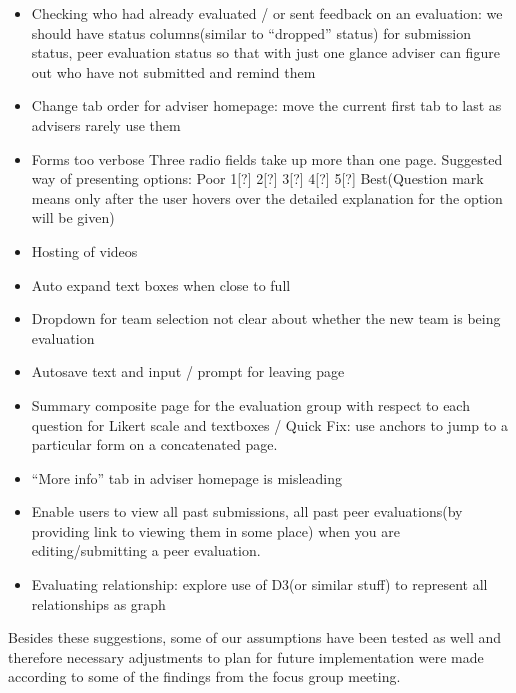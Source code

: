 \begin{itemize}
  \item Checking who had already evaluated / or sent feedback on an evaluation: we should have status columns(similar to ``dropped'' status) for submission status, peer evaluation status so that with just one glance adviser can figure out who have not submitted and remind them
  \item Change tab order for adviser homepage: move the current first tab to last as advisers rarely use them
  \item Forms too verbose Three radio fields take up more than one page. Suggested way of presenting options: Poor 1[?] 2[?] 3[?] 4[?] 5[?] Best(Question mark means only after the user hovers over the detailed explanation for the option will be given)
  \item Hosting of videos
  \item Auto expand text boxes when close to full
  \item Dropdown for team selection not clear about whether the new team is being evaluation
  \item Autosave text and input / prompt for leaving page
  \item Summary composite page for the evaluation group with respect to each question for Likert scale and textboxes / Quick Fix: use anchors to jump to a particular form on a concatenated page.
  \item ``More info'' tab in adviser homepage is misleading
  \item Enable users to view all past submissions, all past peer evaluations(by providing link to viewing them in some place) when you are editing/submitting a peer evaluation.
  \item Evaluating relationship: explore use of D3(or similar stuff) to represent all relationships as graph
\end{itemize}

Besides these suggestions, some of our assumptions have been tested as well and therefore necessary adjustments to plan for future implementation were made according to some of the findings from the focus group meeting.
